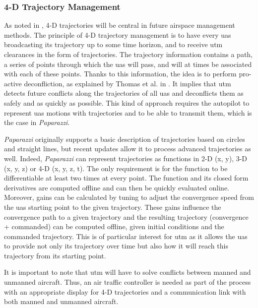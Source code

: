 	\subsubsection{4-D Trajectory Management}
		As noted in \cite{erzberger_4D_2002}, 4-D trajectories will be central in future airspace management methods. The principle of 4-D trajectory management is to have every \gls{uas} broadcasting its trajectory up to some time horizon, and to receive \gls{utm} clearances in the form of trajectories. 
		The trajectory information contains a path, a series of points through which the \gls{uas} will pass, and will at times be associated with each of these points. 
		Thanks to this information, the idea is to perform pro-active deconfliction, as explained by Thomas et al. in \cite{thomas_4D_2015}. It implies that \gls{utm} detects future conflicts along the trajectories of all \gls{uas} and deconflicts them as safely and as quickly as possible.
		This kind of approach requires the autopilot to represent \gls{uas} motions with trajectories and to be able to transmit them, which is the case in \emph{Paparazzi}.
		
		\emph{Paparazzi} originally supports a basic description of trajectories based on circles and straight lines, but recent updates allow it to process advanced trajectories as well. 
		Indeed, \emph{Paparazzi} can represent trajectories as functions in 2-D (x, y), 3-D (x, y, z) or 4-D (x, y, z, t). The only requirement is for the function to be differentiable at least two times at every point. The function and its closed form derivatives are computed offline and can then be quickly evaluated online.
		Moreover, gains can be calculated by tuning to adjust the convergence speed from the \gls{uas} starting point to the given trajectory. These gains influence the convergence path to a given trajectory and the resulting trajectory (convergence + commanded) can be computed offline, given initial conditions and the commanded trajectory.
		This is of particular interest for \gls{utm} as it allows the \gls{uas} to provide not only its trajectory over time but also how it will reach this trajectory from its starting point.	

		It is important to note that \gls{utm} will have to solve conflicts between manned and unmanned aircraft. Thus, an air traffic controller is needed as part of the process with an appropriate display for 4-D trajectories and a communication link with both manned and unmanned aircraft.
		

